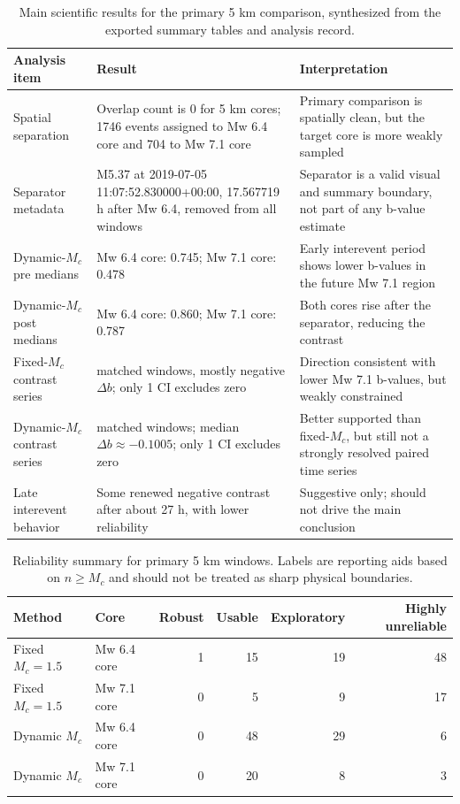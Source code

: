 \documentclass[11pt]{article}
\begin{document}
\begin{table}[H]
\centering
\caption{Main scientific results for the primary 5 km comparison, synthesized from the exported summary tables and analysis record.}
\label{tab:main-results}
\begin{tabularx}{\textwidth}{>{\raggedright\arraybackslash}p{3.1cm} >{\raggedright\arraybackslash}X >{\raggedright\arraybackslash}X}
\toprule
Analysis item & Result & Interpretation \\
\midrule
Spatial separation & Overlap count is 0 for 5 km cores; 1746 events assigned to Mw 6.4 core and 704 to Mw 7.1 core & Primary comparison is spatially clean, but the target core is more weakly sampled \\
Separator metadata & M5.37 at 2019-07-05 11:07:52.830000+00:00, 17.567719 h after Mw 6.4, removed from all windows & Separator is a valid visual and summary boundary, not part of any b-value estimate \\
Dynamic-$M_c$ pre medians & Mw 6.4 core: 0.745; Mw 7.1 core: 0.478 & Early interevent period shows lower b-values in the future Mw 7.1 region \\
Dynamic-$M_c$ post medians & Mw 6.4 core: 0.860; Mw 7.1 core: 0.787 & Both cores rise after the separator, reducing the contrast \\
Fixed-$M_c$ contrast series & 17 matched windows, mostly negative $\Delta b$; only 1 CI excludes zero & Direction consistent with lower Mw 7.1 b-values, but weakly constrained \\
Dynamic-$M_c$ contrast series & 17 matched windows; median $\Delta b\approx -0.1005$; only 1 CI excludes zero & Better supported than fixed-$M_c$, but still not a strongly resolved paired time series \\
Late interevent behavior & Some renewed negative contrast after about 27 h, with lower reliability & Suggestive only; should not drive the main conclusion \\
\bottomrule
\end{tabularx}
\end{table}

\begin{table}[H]
\centering
\caption{Reliability summary for primary 5 km windows. Labels are reporting aids based on $n\geq M_c$ and should not be treated as sharp physical boundaries.}
\label{tab:reliability}
\begin{tabular}{llrrrr}
\toprule
Method & Core & Robust & Usable & Exploratory & Highly unreliable \\
\midrule
Fixed $M_c=1.5$ & Mw 6.4 core & 1 & 15 & 19 & 48 \\
Fixed $M_c=1.5$ & Mw 7.1 core & 0 & 5 & 9 & 17 \\
Dynamic $M_c$ & Mw 6.4 core & 0 & 48 & 29 & 6 \\
Dynamic $M_c$ & Mw 7.1 core & 0 & 20 & 8 & 3 \\
\bottomrule
\end{tabular}
\end{table}
\end{document}
